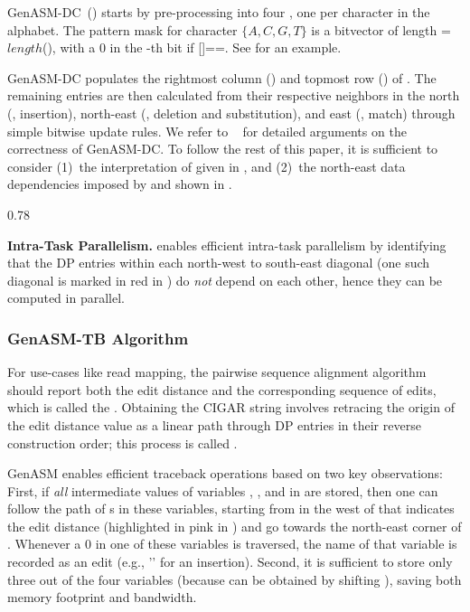 GenASM-DC~() starts by pre-processing  into four , one per character in the alphabet. The pattern mask for character $\{A,C,G,T\}$ is a bitvector of length =$length$(), with a 0 in the -th bit if []==. See  for an example.

GenASM-DC populates the rightmost column () and topmost row () of . The remaining entries are then calculated from their respective neighbors in the north (, insertion), north-east (, deletion and substitution), and east (, match) through simple bitwise update rules. We refer to ~\citep{cali2020genasm,wu_manber_bitap,baeza-yates-gonnet-1992} for detailed arguments on the correctness of GenASM-DC.
To follow the rest of this paper, it is sufficient to consider (1)~the interpretation of  given in , and (2)~the north-east data dependencies imposed by  and shown in .

\begin{algorithm}
\begin{spacing}{0.78}

\end{spacing}
\end{algorithm}

\noindent\textbf{Intra-Task Parallelism.} \label{sec:task_parallelism}
\citep{cali2020genasm} enables efficient intra-task parallelism by identifying that the DP entries within each north-west to south-east diagonal (one such diagonal is marked in red in ) do \emph{not} depend on each other, hence they can be computed in parallel.

\subsubsection{GenASM-TB Algorithm} \label{sec:traceback}
For use-cases like read mapping, the pairwise sequence alignment algorithm should report both the edit distance and the corresponding sequence of edits, which is called the . Obtaining the CIGAR string involves retracing the origin of the edit distance value as a linear path through DP entries in their reverse construction order; this process is called .


GenASM enables efficient traceback operations based on two key observations:
First, if \emph{all} intermediate values of variables , ,  and  in  are stored, then one can follow the path of s in these variables, starting from  in the west of  that indicates the edit distance (highlighted in pink in ) and go towards the north-east corner of . Whenever a 0 in one of these variables is traversed, the name of that variable is recorded as an edit (e.g., '' for an insertion). Second, it is sufficient to store only three out of the four variables (because  can be obtained by shifting ), saving both memory footprint and bandwidth. %

